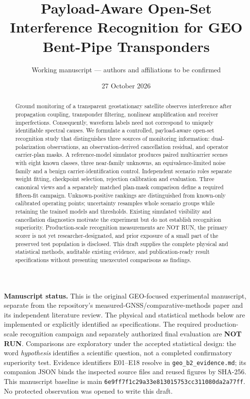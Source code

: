 \documentclass[
  10pt,
]{article}
\title{Payload-Aware Open-Set Interference Recognition for GEO Bent-Pipe
Transponders}
\author{Working manuscript --- authors and affiliations to be confirmed}
\date{27 October 2026}
\begin{document}
\maketitle
\begin{abstract}
Ground monitoring of a transparent geostationary satellite observes
interference after propagation coupling, transponder filtering,
nonlinear amplification and receiver imperfections. Consequently,
waveform labels need not correspond to uniquely identifiable spectral
causes. We formulate a controlled, payload-aware open-set recognition
study that distinguishes three sources of monitoring information:
dual-polarization observations, an observation-derived cancellation
residual, and operator carrier-plan masks. A reference-model simulator
produces paired multicarrier scenes with eight known classes, three
near-family unknowns, an equivalence-limited noise family and a benign
carrier-identification control. Independent scenario roles separate
weight fitting, checkpoint selection, rejection calibration and
evaluation. Three canonical views and a separately matched plan-mask
comparison define a required fifteen-fit campaign. Unknown-positive
rankings are distinguished from known-only calibrated operating points;
uncertainty resamples whole scenario groups while retaining the trained
models and thresholds. Existing simulated visibility and cancellation
diagnostics motivate the experiment but do not establish recognition
superiority. Production-scale recognition measurements are NOT RUN, the
primary scorer is not yet researcher-designated, and prior exposure of a
small part of the preserved test population is disclosed. This draft
supplies the complete physical and statistical methods, auditable
existing evidence, and publication-ready result specifications without
presenting unexecuted comparisons as findings.
\end{abstract}

\textbf{Manuscript status.} This is the original GEO-focused
experimental manuscript, separate from the repository's
measured-GNSS/comparative-methods paper and its independent literature
review. The physical and statistical methods below are implemented or
explicitly identified as specifications. The required production-scale
recognition campaign and separately authorized final evaluation are
\textbf{NOT RUN}. Comparisons are exploratory under the accepted
statistical design: the word \emph{hypothesis} identifies a scientific
question, not a completed confirmatory superiority test. Evidence
identifiers E01--E18 resolve in \texttt{geo\_b2\_evidence.md}; its
companion JSON binds the inspected source files and reused figures by
SHA-256. This manuscript baseline is main
\texttt{6e9ff7f1c29a33e813015753cc311080da2a77ff}. No protected
observation was opened to write this draft.
\end{document}
